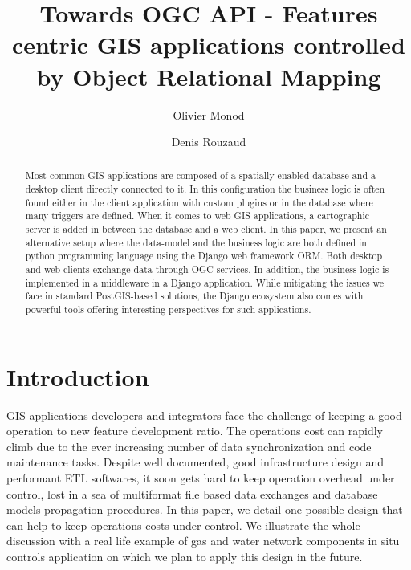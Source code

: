 \documentclass[runningheads]{llncs}
\begin{document}
%
\title{Towards OGC API - Features centric GIS applications controlled by Object Relational Mapping}

%
%
\author{Olivier Monod \and Denis Rouzaud}
%
%
%
\maketitle              %
%
\begin{abstract}
Most common GIS applications are composed of a spatially enabled database and a desktop client directly connected to it. In this configuration the business logic is often found either in the client application with custom plugins or in the database where many triggers are defined. When it comes to web GIS applications, a cartographic server is added in between the database and a web client. In this paper, we present an alternative setup where the data-model and the business logic are both defined in python programming language using the Django web framework ORM. Both desktop and web clients exchange data through OGC services.  In addition, the business logic is implemented in a middleware in a Django application. While mitigating the issues we face in standard PostGIS-based solutions, the Django ecosystem also comes with powerful tools offering interesting perspectives for such applications.

\end{abstract}
%
%
%
\section{Introduction}

GIS applications developers and integrators face the challenge of keeping a good operation to new feature development ratio. The operations cost can rapidly climb due to the ever increasing number of data synchronization and code maintenance tasks. Despite well documented, good infrastructure design and performant ETL softwares, it soon gets hard to keep operation overhead under control, lost in a sea of multiformat file based data exchanges and database models propagation procedures. In this paper, we detail one possible design that can help to keep operations costs under control. We illustrate the whole discussion with a real life example of gas and water network components in situ controls application on which we plan to apply this design in the future.
\end{document}
